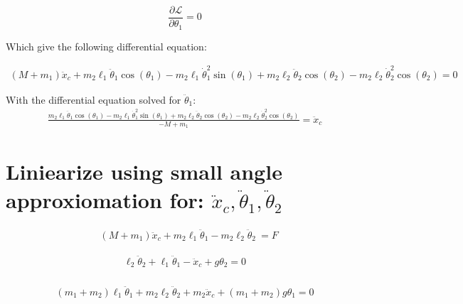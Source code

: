 \documentclass[10pt]{article}
\begin{document}
    
    \begin{equation} \label{eq: lagrange Step3}
        \frac{\partial \mathcal{L}}{\partial\theta_1} = 0
        \end{equation}

    Which give the following differential equation:

    \begin{equation}
        \begin{aligned}
            (M + m_1)\ddot x_c + m_2\ell_1\ddot\theta_1\cos(\theta_1) - m_2\ell_1\dot\theta_1^2\sin(\theta_1) + m_2\ell_2\ddot\theta_2\cos(\theta_2) - m_2\ell_2\dot\theta_2^2\cos(\theta_2) = 0
        \end{aligned}
    \end{equation}   

    With the differential equation solved for $\ddot \theta_1$:
    \begin{equation}
        \begin{aligned}
            \frac{m_2\ell_1\ddot\theta_1\cos(\theta_1) - m_2\ell_1\dot\theta_1^2\sin(\theta_1) + m_2\ell_2\ddot\theta_2\cos(\theta_2) - m_2\ell_2\dot\theta_2^2\cos(\theta_2)}{-M+m_1} = \ddot x_c
        \end{aligned}
    \end{equation}  




    \pagebreak
    \section{Liniearize using small angle approxiomation for: $\ddot x_c, \ddot \theta_1, \ddot \theta_2$}

    \begin{equation}
        \begin{aligned}
            &(M+m_1)\ddot x_c + m_2\ell_1\ddot\theta_1 - m_2\ell_2\ddot\theta_2\    = F
        \end{aligned}   
    \end{equation}

    \begin{equation}
        \begin{aligned}
            \ell_2\ddot \theta_2 + \ell_1  \ddot \theta_1 -  \ddot x_c +g\theta_2 = 0\\
        \end{aligned}   
    \end{equation}
    
    \begin{equation}
        \begin{aligned}
            (m_1 + m_2)\ell_1\ddot \theta_1 + m_2\ell_2\ddot\theta_2
            +   m_2\ddot x_c + (m_1 + m_2)g\theta_1 = 0 
        \end{aligned}   
    \end{equation}
\end{document}
